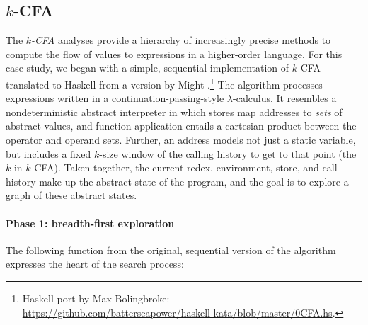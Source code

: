 

\subsection{$k$-CFA}

The {\em $k$-CFA} analyses provide a hierarchy of increasingly precise methods
to compute the flow of values to expressions in a higher-order language.  
For this case study, we began with a simple, sequential implementation of $k$-CFA 
translated to Haskell from a version by Might \cite{MightkCFABlog}.\footnote{Haskell
 port by Max Bolingbroke: \url{https://github.com/batterseapower/haskell-kata/blob/master/0CFA.hs}.}
The algorithm processes expressions written in a
continuation-passing-style $\lambda$-calculus.
It resembles a nondeterministic abstract interpreter in which
stores map addresses to {\em sets} of abstract values, and function
application entails a cartesian product between the operator and operand sets.
%
Further, an address models not just a static variable, but includes a fixed $k$-size window
of the calling history to get to that point (the $k$ in $k$-CFA).
%
Taken together, the current 
redex, environment, store, and call history make up the abstract state of the
program, and the goal is to explore a graph of these abstract states.  
%
%

\paragraph{Phase 1: breadth-first exploration}

The following function
from the original, sequential version of the algorithm
expresses the heart of the search process:


